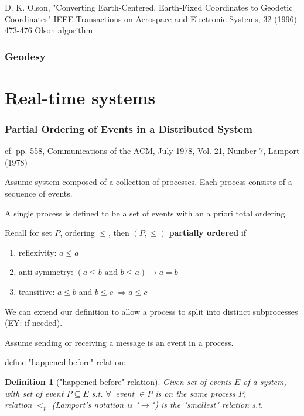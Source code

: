 \documentclass[10pt]{amsart}
\newtheorem{definition}{Definition}
\begin{document}
\begin{multicols*}{2}
D. K. Olson, "Converting Earth-Centered, Earth-Fixed Coordinates to Geodetic Coordinates" IEEE Transactions on Aerospace and Electronic Systems, 32 (1996) 473-476 Olson algorithm

\section{Geodesy}

\part{Real-time systems}

\section{Partial Ordering of Events in a Distributed System}

cf. pp. 558, Communications of the ACM, July 1978, Vol. 21, Number 7, Lamport (1978) \cite{Lamp1978}

Assume system composed of a collection of processes. Each process consists of a sequence of events.

A single process is defined to be a set of events with an a priori total ordering.

Recall for set $P$, ordering $\leq$, then $(P, \leq)$ \textbf{partially ordered} if 
\begin{enumerate}
	\item reflexivity: $a \leq a$
	\item anti-symmetry: $(a\leq b \text{ and } b\leq a) \to a = b$
	\item transitive: $a\leq b$ and $b\leq c$ $\Longrightarrow a \leq c$
\end{enumerate}

We can extend our definition to allow a process to split into distinct subprocesses (EY: if needed).

Assume sending or receiving a message is an event in a process.

define "happened before" relation:

\begin{definition}["happened before" relation]\label{Def:HappenedBeforePartialOrdering}
	Given set of events $E$ of a system, with set of event $P\subseteq E$ s.t. $\forall \, $ event $\in P$ is on the same process $P$, \\
	relation $ <_p$ (Lamport's notation is "$\to$") is the "smallest" relation s.t.
	

\end{definition}
\end{multicols*}
\end{document}
